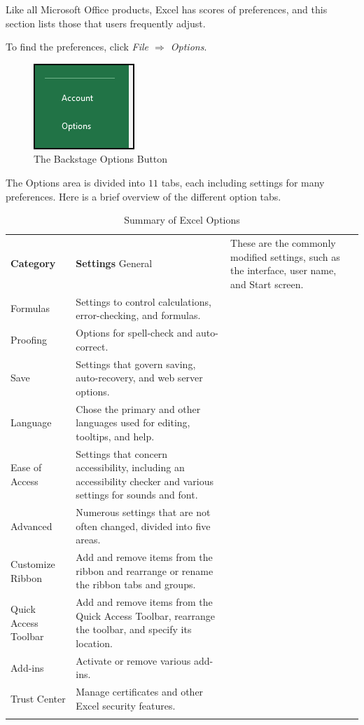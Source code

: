 Like all Microsoft Office products, Excel has scores of preferences, and this section lists those that users frequently adjust.

To find the preferences, click \textit{File $ \Rightarrow $ Options}.

\begin{figure}[H]
	\centering
	\includegraphics[width=\maxwidth{.35\linewidth}]{gfx/ch09_fig50}
	\caption{The Backstage Options Button}
	\label{09:fig68}
\end{figure}
 
The Options area is divided into $ 11 $ tabs, each including settings for many preferences. Here is a brief overview of the different option tabs.

\begin{table}[H]
	{\small
		\begin{longtable}{L{1.00in}L{3.00in}} %
			\textbf{Category} & \textbf{Settings} \endhead
			\hline
			General & These are the commonly modified settings, such as the interface, user name, and Start screen.\\
			Formulas & Settings to control calculations, error-checking, and formulas.\\
			Proofing & Options for spell-check and auto-correct.\\
			Save & Settings that govern saving, auto-recovery, and web server options.\\
			Language & Chose the primary and other languages used for editing, tooltips, and help.\\
			Ease of Access & Settings that concern accessibility, including an accessibility checker and various settings for sounds and font.\\
			Advanced & Numerous settings that are not often changed, divided into five areas.\\
			Customize Ribbon & Add and remove items from the ribbon and rearrange or rename the ribbon tabs and groups.\\
			Quick Access Toolbar & Add and remove items from the Quick Access Toolbar, rearrange the toolbar, and specify its location.\\
			Add-ins & Activate or remove various add-ins.\\
			Trust Center & Manage certificates and other Excel security features.\\
			\caption{Summary of Excel Options}
			\label{09:tab04}
		\end{longtable}
	} %
\end{table}

